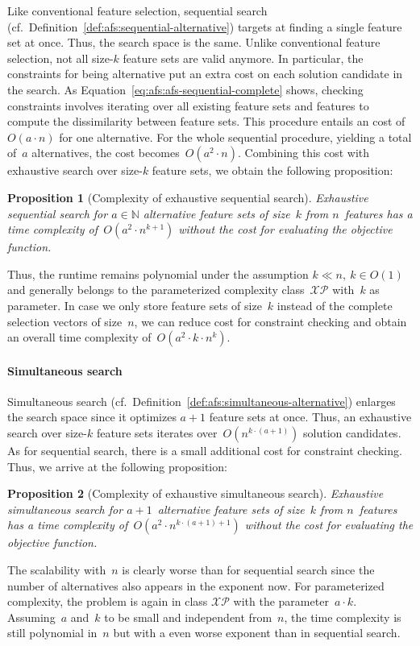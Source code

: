 \documentclass{article}
\newtheorem{proposition}{Proposition}
\theoremstyle{definition}
\begin{document}
Like conventional feature selection, sequential search (cf.~Definition~\ref{def:afs:sequential-alternative}) targets at finding a single feature set at once.
Thus, the search space is the same.
Unlike conventional feature selection, not all size-$k$ feature sets are valid anymore.
In particular, the constraints for being alternative put an extra cost on each solution candidate in the search.
As Equation~\ref{eq:afs:afs-sequential-complete} shows, checking constraints involves iterating over all existing feature sets and features to compute the dissimilarity between feature sets.
This procedure entails an cost of~$O(a \cdot n)$ for one alternative.
For the whole sequential procedure, yielding a total of~$a$ alternatives, the cost becomes~$O(a^2 \cdot n)$.
Combining this cost with exhaustive search over size-$k$ feature sets, we obtain the following proposition:
%
\begin{proposition}[Complexity of exhaustive sequential search]
	Exhaustive sequential search for $a \in \mathbb{N}$ alternative feature sets of size~$k$ from $n$~features has a time complexity of~$O(a^2 \cdot n^{k+1})$ without the cost for evaluating the objective function.
	\label{prop:afs:complexity-exhaustive-sequential}
\end{proposition}
%
Thus, the runtime remains polynomial under the assumption $k \ll n,~k \in O(1)$ and generally belongs to the parameterized complexity class~$\mathcal{XP}$ with~$k$ as parameter.
In case we only store feature sets of size~$k$ instead of the complete selection vectors of size~$n$, we can reduce cost for constraint checking and obtain an overall time complexity of~$O(a^2 \cdot k \cdot n^k)$.

\paragraph{Simultaneous search}

Simultaneous search (cf.~Definition~\ref{def:afs:simultaneous-alternative}) enlarges the search space since it optimizes $a+1$ feature sets at once.
Thus, an exhaustive search over size-$k$ feature sets iterates over~$O(n^{k \cdot (a+1)})$ solution candidates.
As for sequential search, there is a small additional cost for constraint checking.
Thus, we arrive at the following proposition:
%
\begin{proposition}[Complexity of exhaustive simultaneous search]
	Exhaustive simultaneous search for $a + 1$~alternative feature sets of size~$k$ from $n$~features has a time complexity of~$O(a^2 \cdot n^{k \cdot (a+1) + 1})$ without the cost for evaluating the objective function.
	\label{prop:afs:complexity-exhaustive-simultaneuos}
\end{proposition}
%
The scalability with~$n$ is clearly worse than for sequential search since the number of alternatives also appears in the exponent now.
For parameterized complexity, the problem is again in class $\mathcal{XP}$ with the parameter~$a \cdot k$.
Assuming~$a$ and~$k$ to be small and independent from~$n$, the time complexity is still polynomial in~$n$ but with a even worse exponent than in sequential search.
\end{document}
